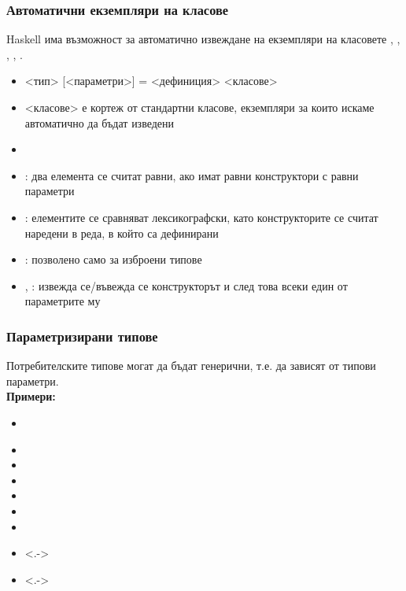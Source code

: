 \documentclass[alsotrans]{beamerswitch}
\begin{document}
\begin{frame}[fragile]
  \frametitle{Автоматични екземпляри на класове}

  Haskell има възможност за автоматично извеждане на екземпляри на класовете , , , , .\pause
  \small
  \begin{itemize}[<+->]
  \item {} <тип> [<параметри>] \tta= <дефиниция>  <класове>
  \item{} <класове> е кортеж от стандартни класове, екземпляри за които искаме автоматично да бъдат изведени
  \item {}\\
    \hspace{5em}
  \item {}: два елемента се считат равни, ако имат равни конструктори с равни параметри
  \item {}: елементите се сравняват лексикографски, като конструкторите се считат наредени в реда, в който са дефинирани
  \item {}: позволено само за изброени типове
  \item {}, : извежда се/въвежда се конструкторът и след това всеки един от параметрите му
  \end{itemize}
\end{frame}

\begin{frame}
  \frametitle{Параметризирани типове}
  Потребителските типове могат да бъдат \alert{генерични}, т.е. да зависят от типови параметри.\\
  \pause
  \textbf{Примери:}
  \begin{itemize}[<+->]
  \item {}\\
      \hspace{5em}
  \item {}
  \item {}
  \item {}
  \item {}
  \item {}
  \item {}
  \item<.-> 
  \item<.-> 
  \end{itemize}
\end{frame}
\end{document}
